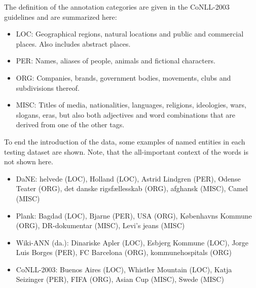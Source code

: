 \documentclass[main.tex]{subfiles}
\begin{document}
The definition of the annotation categories are given in the CoNLL-2003 guidelines \footnotemark and are summarized here:
\begin{itemize}
    \item LOC: Geographical regions, natural locations and public and commercial places. Also includes abstract places.
    \item PER: Names, aliases of people, animals and fictional characters.
    \item ORG: Companies, brands, government bodies, movements, clubs and subdivisions thereof.
    \item MISC: Titles of media, nationalities, languages, religions, ideologies, wars, slogans, eras, but also both adjectives and word combinations that are derived from one of the other tags.
\end{itemize}
To end the introduction of the data, some examples of named entities in each testing dataset are shown.
Note, that the all-important context of the words is not shown here.
\begin{itemize}
    \item DaNE: helvede (LOC), Holland (LOC), Astrid Lindgren (PER), Odense Teater (ORG), det danske rigsfællesskab (ORG), afghansk (MISC), Camel (MISC)
    \item Plank: Bagdad (LOC), Bjarne (PER), USA (ORG), Københavns Kommune (ORG), DR-dokumentar (MISC), Levi's jeans (MISC)
    \item Wiki-ANN (da.): Dinariske Apler (LOC), Esbjerg Kommune (LOC), Jorge Luis Borges (PER), FC Barcelona (ORG), kommunehospitals (ORG)
    \item CoNLL-2003: Buenos Aires (LOC), Whistler Mountain (LOC), Katja Seizinger (PER),  FIFA (ORG), Asian Cup (MISC), Swede (MISC)
\end{itemize}
\end{document}
